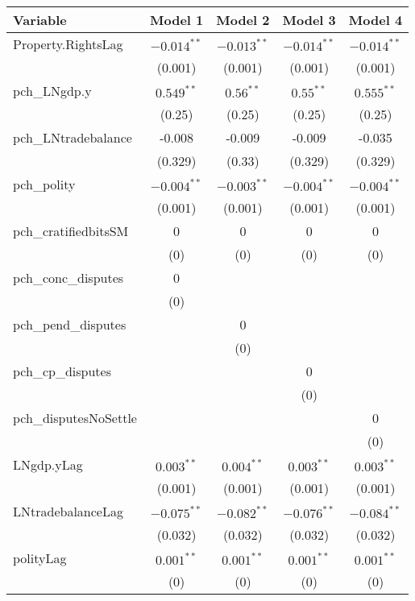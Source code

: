 \begin{table}[ht]
\centering
\begin{tabular}{lcccc}
 Variable & Model 1 & Model 2 & Model 3 & Model 4 \\ 
  \hline
\hline
Property.RightsLag & $-0.014^{\ast\ast}$ & $-0.013^{\ast\ast}$ & $-0.014^{\ast\ast}$ & $-0.014^{\ast\ast}$ \\ 
   & (0.001) & (0.001) & (0.001) & (0.001) \\ 
   \hline
pch\_LNgdp.y & $0.549^{\ast\ast}$ & $0.56^{\ast\ast}$ & $0.55^{\ast\ast}$ & $0.555^{\ast\ast}$ \\ 
   & (0.25) & (0.25) & (0.25) & (0.25) \\ 
  pch\_LNtradebalance & -0.008 & -0.009 & -0.009 & -0.035 \\ 
   & (0.329) & (0.33) & (0.329) & (0.329) \\ 
  pch\_polity & $-0.004^{\ast\ast}$ & $-0.003^{\ast\ast}$ & $-0.004^{\ast\ast}$ & $-0.004^{\ast\ast}$ \\ 
   & (0.001) & (0.001) & (0.001) & (0.001) \\ 
  pch\_cratifiedbitsSM & 0 & 0 & 0 & 0 \\ 
   & (0) & (0) & (0) & (0) \\ 
  pch\_conc\_disputes & 0 &  &  &  \\ 
   & (0) &  &  &  \\ 
  pch\_pend\_disputes &  & 0 &  &  \\ 
   &  & (0) &  &  \\ 
  pch\_cp\_disputes &  &  & 0 &  \\ 
   &  &  & (0) &  \\ 
  pch\_disputesNoSettle &  &  &  & 0 \\ 
   &  &  &  & (0) \\ 
   \hline
LNgdp.yLag & $0.003^{\ast\ast}$ & $0.004^{\ast\ast}$ & $0.003^{\ast\ast}$ & $0.003^{\ast\ast}$ \\ 
   & (0.001) & (0.001) & (0.001) & (0.001) \\ 
  LNtradebalanceLag & $-0.075^{\ast\ast}$ & $-0.082^{\ast\ast}$ & $-0.076^{\ast\ast}$ & $-0.084^{\ast\ast}$ \\ 
   & (0.032) & (0.032) & (0.032) & (0.032) \\ 
  polityLag & $0.001^{\ast\ast}$ & $0.001^{\ast\ast}$ & $0.001^{\ast\ast}$ & $0.001^{\ast\ast}$ \\ 
   & (0) & (0) & (0) & (0) \\ 

\end{tabular}
\end{table}
